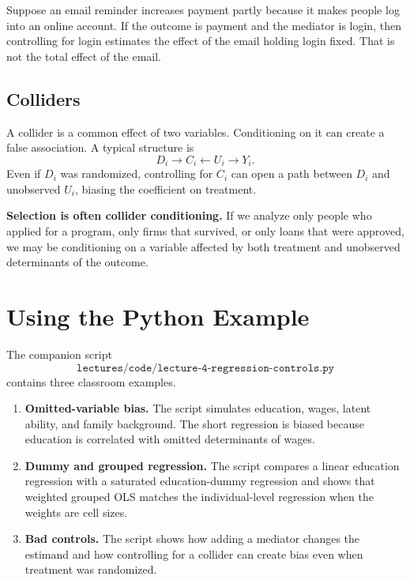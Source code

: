 \begin{exmp}
Suppose an email reminder increases payment partly because it makes people log
into an online account. If the outcome is payment and the mediator is login,
then controlling for login estimates the effect of the email holding login
fixed. That is not the total effect of the email.
\end{exmp}

\subsection{Colliders}

A collider is a common effect of two variables. Conditioning on it can create
a false association. A typical structure is
\[
  D_i \rightarrow C_i \leftarrow U_i \rightarrow Y_i.
\]
Even if $D_i$ was randomized, controlling for $C_i$ can open a path between
$D_i$ and unobserved $U_i$, biasing the coefficient on treatment.

\begin{boxF}
\textbf{Selection is often collider conditioning.} If we analyze only people
who applied for a program, only firms that survived, or only loans that were
approved, we may be conditioning on a variable affected by both treatment and
unobserved determinants of the outcome.
\end{boxF}

\section{Using the Python Example}

The companion script
\[
  \texttt{lectures/code/lecture-4-regression-controls.py}
\]
contains three classroom examples.

\begin{enumerate}
\item \textbf{Omitted-variable bias.} The script simulates education, wages,
latent ability, and family background. The short regression is biased because
education is correlated with omitted determinants of wages.
\item \textbf{Dummy and grouped regression.} The script compares a linear
education regression with a saturated education-dummy regression and shows
that weighted grouped OLS matches the individual-level regression when the
weights are cell sizes.
\item \textbf{Bad controls.} The script shows how adding a mediator changes
the estimand and how controlling for a collider can create bias even when
treatment was randomized.
\end{enumerate}

